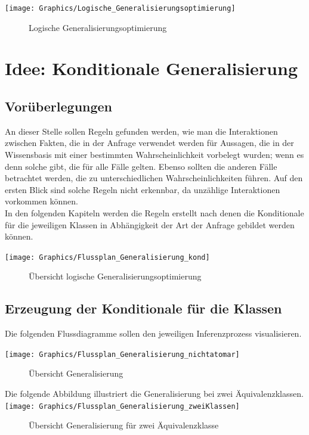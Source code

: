 \documentclass[a4paper, 11pt]{book}
\begin{document}
\texttt{[image: Graphics/Logische\_Generalisierungsoptimierung]}
\begin{figure}[h]
	\caption{Logische Generalisierungsoptimierung }
	\label{Abb_Log_Gen}
\end{figure}



\section{Idee: Konditionale Generalisierung}
\subsection{Vorüberlegungen}
An dieser Stelle sollen Regeln gefunden werden, wie man die Interaktionen zwischen Fakten, die in der Anfrage verwendet werden für Aussagen, die in der Wissensbasis mit einer bestimmten Wahrscheinlichkeit vorbelegt wurden; wenn es denn solche gibt, die für alle Fälle gelten. Ebenso sollten die anderen Fälle betrachtet werden, die zu unterschiedlichen Wahrscheinlichkeiten führen. Auf den ersten Blick sind solche Regeln nicht erkennbar, da unzählige Interaktionen vorkommen können.\\
In den folgenden Kapiteln werden die Regeln erstellt nach denen die Konditionale für die jeweiligen Klassen in Abhängigkeit der Art der Anfrage gebildet werden können.\\
\newpage


\texttt{[image: Graphics/Flussplan\_Generalisierung\_kond]}
\begin{figure}[h]
	\caption{Übersicht logische Generalisierungsoptimierung}
	\label{Fig_Log_Genopt}
\end{figure}


\subsection{Erzeugung der Konditionale für die Klassen}
Die folgenden Flussdiagramme sollen den jeweiligen Inferenzprozess visualisieren.

\texttt{[image: Graphics/Flussplan\_Generalisierung\_nichtatomar]}
\begin{figure}[h]
	\caption{Übersicht Generalisierung}
	\label{Fig_General}
\end{figure}
\newpage
Die folgende Abbildung illustriert die Generalisierung bei zwei Äquivalenzklassen.
\texttt{[image: Graphics/Flussplan\_Generalisierung\_zweiKlassen]}
\begin{figure}[h]
	\caption{Übersicht Generalisierung für zwei Äquivalenzklasse}
	\label{Fig_ZweiKlassen}
\end{figure}
\end{document}
